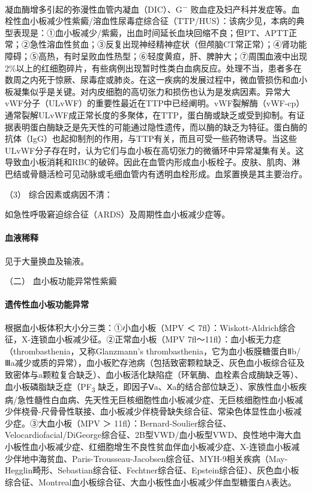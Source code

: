 凝血酶增多引起的弥漫性血管内凝血（DIC）、G\textsuperscript{−}
败血症及妇产科并发症等。血栓性血小板减少性紫癜/溶血性尿毒症综合征（TTP/HUS）：该病少见，本病的典型表现是：①血小板减少/紫癜，出血时间延长血块回缩不良；但PT、APTT正常；②急性溶血性贫血；③反复出现神经精神症状（但颅脑CT常正常）；④肾功能障碍；⑤高热，有时呈败血性热型；⑥轻度黄疸，肝、脾肿大；⑦周围血液中出现2\%以上的红细胞碎片，有些病例出现暂时性类白血病反应。处理不当，患者多在数周之内死于惊厥、尿毒症或肺炎。在这一疾病的发展过程中，微血管损伤和血小板凝集似乎是关键。对内皮细胞的高切张力和损伤也认为是发病因素。异常大vWF分子（ULvWF）的重要性最近在TTP中已经阐明。vWF裂解酶（vWF-cp）通常裂解ULvWF成正常长度的多聚体，在TTP，蛋白酶或缺乏或受到抑制。有证据表明蛋白酶缺乏是先天性的可能通过隐性遗传，而以酶的缺乏为特征。蛋白酶的抗体（IgG）也起抑制剂的作用，与TTP有关，而且可受一些药物诱导。当这些ULvWF分子存在时，认为它们与血小板在高切张力的微循环中异常凝集有关。这导致血小板消耗和RBC的破碎。因此在血管内形成血小板栓子。皮肤、肌肉、淋巴结或骨髓活检可见动脉或毛细血管内有透明血栓形成。血浆置换是其主要治疗。

\hypertarget{text00036.htmlux5cux23CHP1-14-1-2-1-5-3}{}
（3） 综合因素或病因不清：

如急性呼吸窘迫综合征（ARDS）及周期性血小板减少症等。

\paragraph{血液稀释}

见于大量换血及输液。

\hypertarget{text00036.htmlux5cux23CHP1-14-1-2-2}{}
（二） 血小板功能异常性紫癜

\paragraph{遗传性血小板功能异常}

根据血小板体积大小分三类：①小血小板（MPV ＜
7fl）：Wiskott-Aldrich综合征，X-连锁血小板减少征。②正常血小板（MPV
7fl～11fl）：血小板无力症（thrombasthenia，又称Glanzmann's
thrombasthenia，它为血小板膜糖蛋白Ⅱb/Ⅲa减少或质的异常），血小板贮存池病（包括致密颗粒缺乏、灰色血小板综合征及致密体与a颗粒复合缺乏）、血小板活化缺陷症（环氧酶、血栓素合成酶缺乏等）、血小板磷脂缺乏症（PF\textsubscript{3}
缺乏，即因子Ⅴa、Ⅹa的结合部位缺乏）、家族性血小板疾病/急性髓性白血病、先天性无巨核细胞性血小板减少症、无巨核细胞性血小板减少伴桡骨-尺骨骨性联接、血小板减少伴桡骨缺失综合征、常染色体显性血小板减少症。③大血小板（MPV
＞
11fl）：Bernard-Soulier综合征、Velocardiofacial/DiGeorge综合征、2B型VWD/血小板型VWD、良性地中海大血小板性血小板减少症、红细胞增生不良性贫血伴血小板减少症、X-连锁血小板减少伴地中海贫血、Paris-Trousseau-Jacobsen综合征、MYH-9相关疾病（May-Hegglin畸形、Sebastian综合征、Fechtner综合征、Epstein综合征）、灰色血小板综合征、Montreal血小板综合征、大血小板性血小板减少伴血型糖蛋白A表达。

